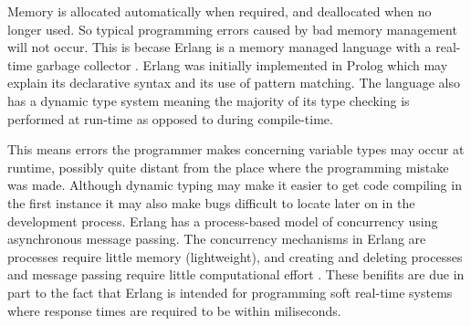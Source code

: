 \documentclass[main.tex]{subfiles}
\begin{document}
Memory is allocated automatically when required, and deallocated when no longer used. So typical programming errors caused by bad memory management will not occur. This is becase Erlang is a memory managed language with a real-time garbage collector \cite{Armstrong1995}. Erlang was initially implemented in Prolog which may explain its declarative syntax and its use of pattern matching\cite{Armstrong2009}. The language also has a dynamic type system meaning the majority of its type checking is performed at run-time as opposed to during compile-time.

This means errors the programmer makes concerning variable types may occur at runtime, possibly quite distant from the place where the programming mistake was made. Although dynamic typing  may make it easier to get code compiling in the first instance it may also make bugs difficult to locate later on in the development process. Erlang has a process-based model of concurrency using asynchronous message passing. The concurrency mechanisms in Erlang are processes require little memory (lightweight), and creating and deleting processes and message passing require little computational effort \cite{Armstrong1995}. These benifits are due in part to the fact that Erlang is intended for programming soft real-time systems where response times are required to be within miliseconds.
\end{document}

